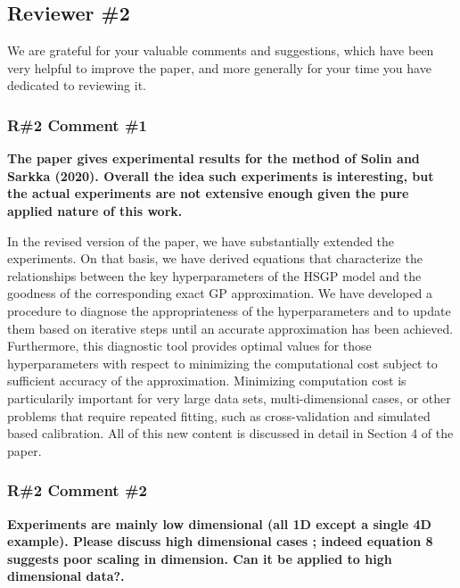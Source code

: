 \documentclass[11pt]{report}
\begin{document}
\noindent \hdashrule{12.5cm}{0.2pt}{2mm 1pt}

\subsection*{Reviewer \#2}

We are grateful for your valuable comments and suggestions, which have been very helpful to improve the paper, and more generally for your time you have dedicated to reviewing it.

\subsubsection*{R\#2 Comment \#1}

\textbf{The paper gives experimental results for the method of Solin and Sarkka  (2020). Overall the idea such experiments is interesting, but the actual experiments are not extensive enough given the pure applied nature of this work.}

In the revised version of the paper, we have substantially extended the experiments. On that basis, we have derived equations that characterize the relationships between the key hyperparameters of the HSGP model and  the goodness of the corresponding exact GP approximation. We have developed a procedure to diagnose the appropriateness of the hyperparameters and to update them based on iterative steps until an accurate approximation has been achieved. Furthermore, this diagnostic tool provides optimal values for those hyperparameters with respect to minimizing the computational cost subject to sufficient accuracy of the approximation. Minimizing computation cost is particularily important for very large data sets, multi-dimensional cases, or other problems that require repeated fitting, such as cross-validation and simulated based calibration. All of this new content is discussed in detail in Section 4 of the paper.




\subsubsection*{R\#2 Comment \#2}

\textbf{Experiments are mainly low dimensional (all 1D except a single 4D example). Please discuss high dimensional cases ; indeed equation 8 suggests poor scaling in dimension. Can it be applied to high dimensional data?.} 
\end{document}
